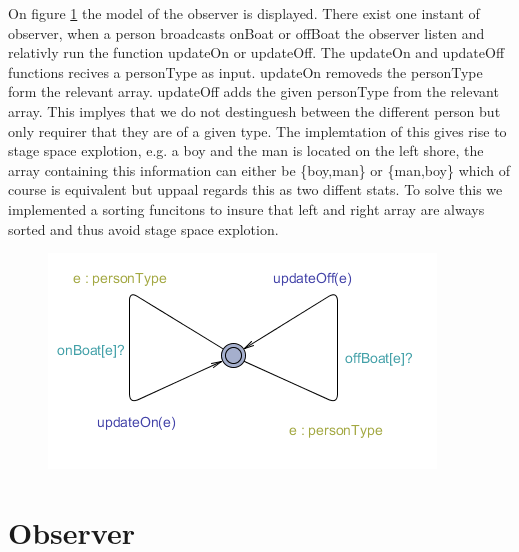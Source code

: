 On figure \ref{fig:observer} the model of the observer is displayed. There exist one instant of observer, when a person broadcasts onBoat or offBoat the observer listen and relativly run the function updateOn or updateOff. 
The updateOn and updateOff functions recives a personType as input. updateOn removeds the personType form the relevant array. updateOff adds the given personType from the relevant array. This implyes that we do not destinguesh between the different person but only requirer that they are of a given type. The implemtation of this gives rise to stage space explotion, e.g. a boy and the man is located on the left shore, the array containing this information can either be \{boy,man\} or \{man,boy\} which of course is equivalent but uppaal regards this as two diffent stats. To solve this we implemented a sorting funcitons to insure that left and right array are always sorted and thus avoid stage space explotion.
  




\begin{figure}%
\includegraphics[width=\columnwidth]{pictures/observer.png}%
\caption{}%
\label{fig:observer}%
\end{figure}




























\section{Observer}